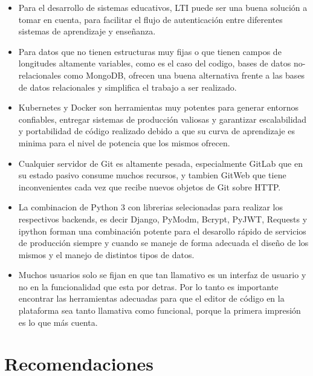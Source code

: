 \begin{itemize}
  \item Para el desarrollo de sistemas educativos, LTI puede ser una buena solución a tomar en cuenta, para facilitar el flujo de autenticación entre diferentes sistemas de aprendizaje y enseñanza.
  \item Para datos que no tienen estructuras muy fijas o que tienen campos de longitudes altamente variables, como es el caso del codigo, bases de datos no-relacionales como MongoDB, ofrecen una buena alternativa frente a las bases de datos relacionales y simplifica el trabajo a ser realizado.
  \item Kubernetes y Docker son herramientas muy potentes para generar entornos confiables, entregar sistemas de producción valiosas y garantizar escalabilidad y portabilidad de código realizado debido a que su curva de aprendizaje es minima para el nivel de potencia que los mismos ofrecen.
  \item Cualquier servidor de Git es altamente pesada, especialmente GitLab que en su estado pasivo consume muchos recursos, y tambien GitWeb que tiene inconvenientes cada vez que recibe nuevos objetos de Git sobre HTTP.
  \item La combinacion de Python 3 con librerias selecionadas para realizar los respectivos backends, es decir Django, PyModm, Bcrypt, PyJWT, Requests y ipython forman una combinación potente para el desarollo rápido de servicios de producción siempre y cuando se maneje de forma adecuada el diseño de los mismos y el manejo de distintos tipos de datos.
  \item Muchos usuarios solo se fijan en que tan llamativo es un interfaz de usuario y no en la funcionalidad que esta por detras. Por lo tanto es importante encontrar las herramientas adecuadas para que el editor de código en la plataforma sea tanto llamativa como funcional, porque la primera impresión es lo que más cuenta.
\end{itemize}


\section{Recomendaciones}

